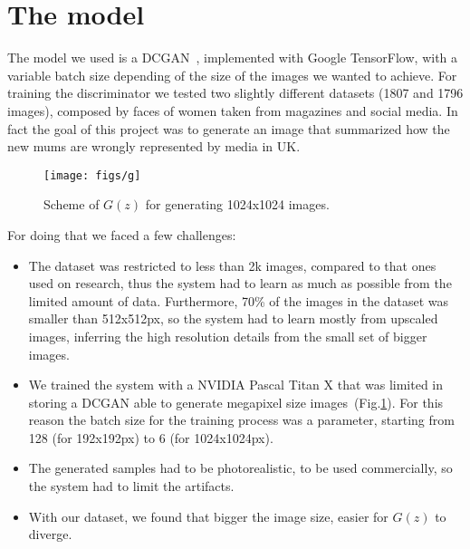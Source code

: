 \documentclass[10pt,twocolumn,letterpaper]{article}
\begin{document}
\section{The model}
The model we used is a DCGAN~\cite{DBLP:journals/corr/RadfordMC15}, implemented with Google TensorFlow, with a variable batch size depending of the size of the images we wanted to achieve.
For training the discriminator we tested two slightly different datasets (1807 and 1796 images), composed by faces of women taken from magazines and social media. In fact the goal of this project was to generate an image that summarized how the new mums are wrongly represented by media in UK.

\begin{figure}[ht]
  \centering
  \texttt{[image: figs/g]}
  \caption{Scheme of $G(z)$ for generating 1024x1024 images.}
  \label{fig:generator}
\end{figure}

For doing that we faced a few challenges:
\begin{itemize}
\item{The dataset was restricted to less than 2k ima\-ges, compared to that ones used on research, thus the system had to learn as much as possible from the limited amount of data. Furthermore, 70\% of the images in the dataset was smaller than 512x512px, so the system had to learn mostly from upscaled images, inferring the high resolution details from the small set of bigger images.}
\item{We trained the system with a NVIDIA Pascal Titan X that was limited in storing a DCGAN able to generate megapixel size images~(Fig.\ref{fig:generator}). For this reason the batch size for the training process was a parameter, starting from 128 (for 192x192px) to 6 (for 1024x1024px).}
\item{ The generated samples had to be photorealistic, to be used commercially, so the system had to limit the artifacts.}
\item{With our dataset, we found that bigger the ima\-ge size, easier for $G(z)$ to diverge.}
\end{itemize}
\end{document}
